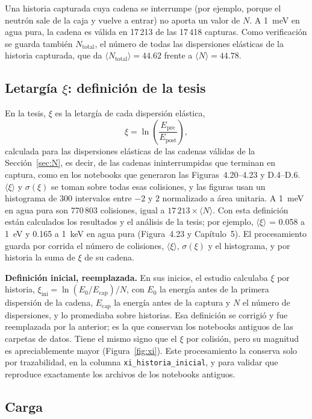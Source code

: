 \documentclass[11pt,a4paper]{article}
\newcommand{\archivo}[1]{\path{#1}}
\newcommand{\var}[1]{\texttt{#1}}
\begin{document}
Una historia capturada cuya cadena se interrumpe (por ejemplo, porque el neutrón sale de la caja y vuelve a entrar) no aporta un valor de $N$. A 1~meV en agua pura, la cadena es válida en 17\,213 de las 17\,418 capturas. Como verificación se guarda también $N_\mathrm{total}$, el número de todas las dispersiones elásticas de la historia capturada, que da $\langle N_\mathrm{total}\rangle = 44.62$ frente a $\langle N\rangle = 44.78$.

\subsection{Letargía $\xi$: definición de la tesis}
\label{sec:xi}

En la tesis, $\xi$ es la letargía de cada dispersión elástica,
\[
\xi = \ln\!\left(\frac{E_\mathrm{pre}}{E_\mathrm{post}}\right),
\]
calculada para las dispersiones elásticas de las cadenas válidas de la Sección~\ref{sec:N}, es decir, de las cadenas ininterrumpidas que terminan en captura, como en los notebooks \archivo{Histogramas_cita_*.ipynb} que generaron las Figuras~4.20--4.23 y D.4--D.6. $\langle\xi\rangle$ y $\sigma(\xi)$ se toman sobre todas esas colisiones, y las figuras usan un histograma de 300 intervalos entre $-2$ y $2$ normalizado a área unitaria. A 1~meV en agua pura son 770\,803 colisiones, igual a $17\,213\times\langle N\rangle$. Con esta definición están calculados los resultados y el análisis de la tesis; por ejemplo, $\langle\xi\rangle$ = 0.058 a 1~eV y 0.165 a 1~keV en agua pura (Figura~4.23 y Capítulo~5). El procesamiento guarda por corrida el número de colisiones, $\langle\xi\rangle$, $\sigma(\xi)$ y el histograma, y por historia la suma de $\xi$ de su cadena.

\textbf{Definición inicial, reemplazada.} En sus inicios, el estudio calculaba $\xi$ por historia, $\xi_\mathrm{ini} = \ln(E_0/E_\mathrm{cap})/N$, con $E_0$ la energía antes de la primera dispersión de la cadena, $E_\mathrm{cap}$ la energía antes de la captura y $N$ el número de dispersiones, y lo promediaba sobre historias. Esa definición se corrigió y fue reemplazada por la anterior; es la que conservan los notebooks antiguos de las carpetas de datos. Tiene el mismo signo que el $\xi$ por colisión, pero su magnitud es apreciablemente mayor (Figura~\ref{fig:xi}). Este procesamiento la conserva solo por trazabilidad, en la columna \var{xi\_historia\_inicial}, y para validar que reproduce exactamente los archivos de los notebooks antiguos.

\subsection{Carga}
\end{document}
